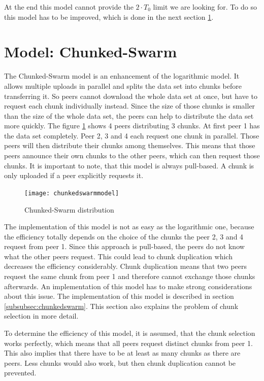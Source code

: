 At the end this model cannot provide the $2 \cdot T_0$ limit we are looking for. To do so this model has to be improved, which is done in the next section \ref{sec:chunkedswarmmodel}.


\section{Model: Chunked-Swarm}
\label{sec:chunkedswarmmodel}
The Chunked-Swarm model is an enhancement of the logarithmic model. It allows multiple uploads in parallel and splits the data set into chunks before transferring it. So peers cannot download the whole data set at once, but have to request each chunk individually instead. Since the size of those chunks is smaller than the size of the whole data set, the peers can help to distribute the data set more quickly. The figure \ref{fig:chunkedswarmmodel} shows 4 peers distributing 3 chunks. At first peer 1 has the data set completely. Peer 2, 3 and 4 each request one chunk in parallel. Those peers will then distribute their chunks among themselves. This means that those peers announce their own chunks to the other peers, which can then request those chunks. It is important to note, that this model is always pull-based. A chunk is only uploaded if a peer explicitly requests it.

\begin{figure}[H]
\centering
\texttt{[image: chunkedswarmmodel]}
\caption{Chunked-Swarm distribution}
\label{fig:chunkedswarmmodel}
\end{figure}

The implementation of this model is not as easy as the logarithmic one, because the efficiency totally depends on the choice of the chunks the peer 2, 3 and 4 request from peer 1. Since this approach is pull-based, the peers do not know what the other peers request. This could lead to chunk duplication which decreases the efficiency considerably. Chunk duplication means that two peers request the same chunk from peer 1 and therefore cannot exchange those chunks afterwards. An implementation of this model has to make strong considerations about this issue. The implementation of this model is described in section \ref{subsubsec:chunkedswarm}. This section also explains the problem of chunk selection in more detail.

To determine the efficiency of this model, it is assumed, that the chunk selection works perfectly, which means that all peers request distinct chunks from peer 1. This also implies that there have to be at least as many chunks as there are peers. Less chunks would also work, but then chunk duplication cannot be prevented.

